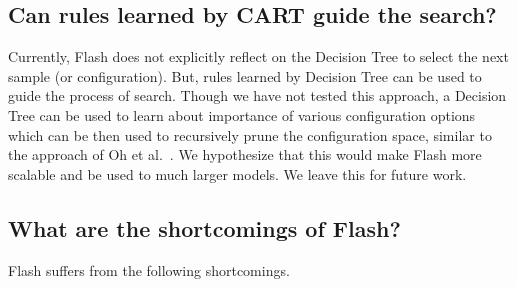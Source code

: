 \documentclass[10pt,journal,compsoc]{IEEEtran}
\newcommand{\flash}{{\sc Flash}\xspace}
\begin{document}
\subsection{Can rules learned by CART  guide the search?}
Currently, \flash does not explicitly reflect on the Decision Tree to select the next sample (or configuration). But, rules learned by Decision Tree can be used to guide the process of search. Though we have not tested this approach, a Decision Tree can be used to learn about importance of various configuration options which can be then used to recursively prune the configuration space, similar to the approach of Oh et al.~\cite{oh2017finding}. We hypothesize that this would make \flash more scalable and be used to much larger models. We leave this for future work. 

\subsection{What are the shortcomings of \flash?}  
\flash  suffers from the following shortcomings.
\end{document}
